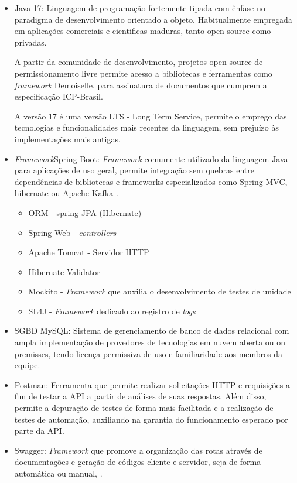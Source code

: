 \documentclass[
    12pt,               %
    openright,          %
    oneside,
    a4paper,            %
    BIBLATEX,           %
    TODO,               %
    english,            %
    brazil              %
    ]{ifsp-spo-inf-ctds}
\begin{document}
            \begin{itemize}
                \item Java 17: 
                    Linguagem de programação fortemente tipada com ênfase no paradigma de desenvolvimento orientado a objeto. Habitualmente empregada em aplicações comerciais e cientificas maduras, tanto open source como privadas.
    
                    A partir da comunidade de desenvolvimento, projetos open source de permissionamento livre permite acesso a bibliotecas e ferramentas como \emph{framework} Demoiselle, para assinatura de documentos que cumprem a especificação ICP-Brasil.
                    
                    A versão 17 é uma versão LTS - Long Term Service, permite o emprego das tecnologias e funcionalidades mais recentes da linguagem, sem prejuízo às implementações mais antigas.
        
                \item \emph{Framework}Spring Boot: 
                   \emph{ Framework} comumente utilizado da linguagem Java para aplicações de uso geral, permite integração sem quebras entre dependências de bibliotecas e frameworks especializados como Spring MVC, hibernate ou Apache Kafka .
                    \begin{itemize}
                        \item ORM - spring JPA (Hibernate)
                        \item Spring Web - \emph{controllers}
                        \item Apache Tomcat - Servidor HTTP
                        \item Hibernate Validator
                        \item Mockito - \emph{Framework} que auxilia o desenvolvimento de testes de unidade
                        \item SL4J - \emph{Framework} dedicado ao registro de \emph{logs}
                    \end{itemize}
                \item SGBD MySQL:
                    Sistema de gerenciamento de banco de dados relacional com ampla implementação de provedores de tecnologias em nuvem aberta ou on premisses, tendo licença permissiva de uso e familiaridade aos membros da equipe.

                \item Postman:
                Ferramenta que permite realizar solicitações HTTP e requisições a fim de testar a API a partir de análises de suas respostas. Além disso, permite a depuração de testes de forma mais facilitada e a realização de testes de automação, auxiliando na garantia do funcionamento esperado por parte da API. 

                \item Swagger:
                \emph{Framework} que promove a organização das rotas através de documentações e geração de códigos cliente e servidor, seja de forma automática ou manual, .

            \end{itemize} 
\end{document}
